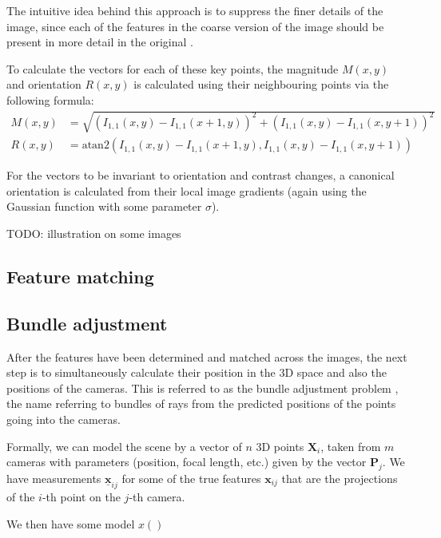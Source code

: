 The intuitive idea behind this approach is to suppress the finer details of the image, since each of the features in the coarse version of the image should be present in more detail in the original \cite{scalespace}.

To calculate the vectors for each of these key points, the magnitude $M(x,y)$ and orientation $R(x,y)$ is calculated using their neighbouring points via the following formula:
$$
\begin{aligned}
	M(x,y) &= \sqrt{\left(I_{1,1}(x, y) - I_{1,1}(x + 1, y)\right)^2 + \left(I_{1,1}(x,y) - I_{1,1}(x, y + 1)\right)^2} \\[0.7em]
	R(x,y) &= \mathrm{atan2} \left(I_{1,1}(x, y) - I_{1,1}(x + 1, y), I_{1,1}(x,y) - I_{1,1}(x, y + 1)\right)
\end{aligned}
$$

For the vectors to be invariant to orientation and contrast changes, a canonical orientation is calculated from their local image gradients (again using the Gaussian function with some parameter $\sigma$).

TODO: illustration on some images

\subsection{Feature matching}


\subsection{Bundle adjustment}
After the features have been determined and matched across the images, the next step is to simultaneously calculate their position in the 3D space and also the positions of the cameras.
This is referred to as the bundle adjustment problem \cite{schneider19913,snavely2008modeling}, the name referring to bundles of rays from the predicted positions of the points going into the cameras.

Formally, we can model the scene by a vector of $n$ 3D points $\mathbf{X}_i$, taken from $m$ cameras with parameters (position, focal length, etc.) given by the vector $\mathbf{P}_j$.
We have measurements $\underline{\mathbf{x}}_{ij}$ for some of the true features $\mathbf{x}_{ij}$ that are the projections of the $i$-th point on the $j$-th camera.

We then have some model $x()$

